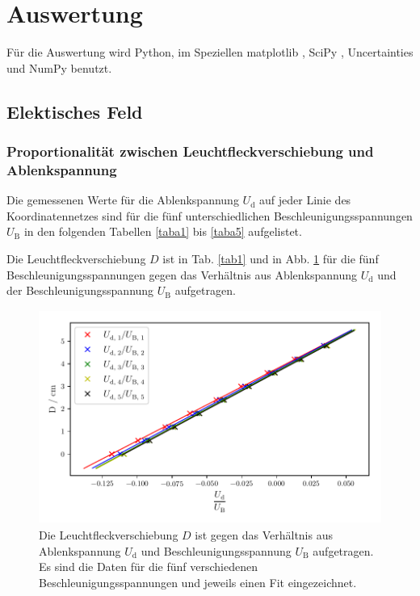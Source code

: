 \section{Auswertung}
\label{sec:Auswertung}

Für die Auswertung wird Python, im Speziellen matplotlib \cite{matplotlib}, 
SciPy \cite{scipy}, Uncertainties \cite{uncertainties}
und NumPy \cite{numpy} benutzt.

\subsection{Elektisches Feld}
\subsubsection{Proportionalität zwischen Leuchtfleckverschiebung und Ablenkspannung}
\label{sec:prop}
Die gemessenen Werte für die Ablenkspannung $U_\text{d}$
auf jeder Linie des Koordinatennetzes sind für die fünf
unterschiedlichen Beschleunigungsspannungen $U_\text{B}$
in den folgenden Tabellen \ref{taba1} bis \ref{taba5} aufgelistet.






\noindent Die Leuchtfleckverschiebung $D$ ist in Tab. \ref{tab1} und in Abb. \ref{fig:plot1}
für die fünf Beschleunigungsspannungen gegen das Verhältnis aus 
Ablenkspannung $U_\text{d}$ und der Beschleunigungsspannung $U_\text{B}$ aufgetragen.



\begin{figure}
    \centering
    \includegraphics[width=12cm, height=7cm]{build/plot1.pdf}
    \caption{Die Leuchtfleckverschiebung $D$ ist gegen das Verhältnis aus 
        Ablenkspannung $U_\text{d}$ und Beschleunigungsspannung $U_\text{B}$ aufgetragen. Es sind die Daten
    für die fünf verschiedenen Beschleunigungsspannungen und
    jeweils einen Fit eingezeichnet.}
    \label{fig:plot1}
\end{figure}

